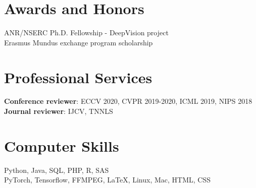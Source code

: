 \documentclass[10pt]{res} %
\begin{document}
\begin{resume}

\section{\large Awards and Honors} 
ANR/NSERC Ph.D. Fellowship - DeepVision project \\
Erasmus Mundus exchange program scholarship


\section{\large Professional Services}
\textbf{Conference reviewer}: ECCV 2020, CVPR 2019-2020, ICML 2019, NIPS 2018 \\
\textbf{Journal reviewer}: IJCV, TNNLS


\section{\large Computer Skills} 
Python, Java, SQL, PHP, R, SAS \\
PyTorch, Tensorflow, FFMPEG, \LaTeX, Linux, Mac, HTML, CSS


\end{resume}
\end{document}
